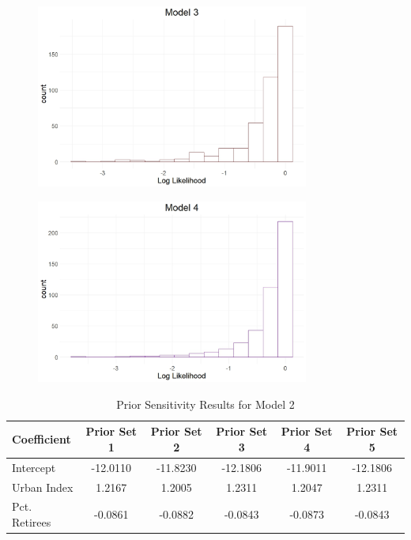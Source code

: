 \documentclass[12pt]{article}
\begin{document}
\begin{figure}[h]
	\centering
	\includegraphics[width=0.8\textwidth]{model_comp_figures/LL_model3.jpeg}
	\caption{}
	\label{}
\end{figure}

\begin{figure}[h]
	\centering
	\includegraphics[width=0.8\textwidth]{model_comp_figures/LL_model4.jpeg}
	\caption{}
	\label{}
\end{figure}

\begin{table}[h]
    \centering
    \begin{tabular}{l|ccccc}
        \hline
        Coefficient    & Prior Set 1 & Prior Set 2 & Prior Set 3 & Prior Set 4 & Prior Set 5 \\
        \hline
        Intercept      & -12.0110 & -11.8230 & -12.1806 & -11.9011 & -12.1806 \\
        Urban Index    & 1.2167 & 1.2005 & 1.2311 & 1.2047 & 1.2311 \\
        Pct. Retirees  & -0.0861 & -0.0882 & -0.0843 & -0.0873 & -0.0843 \\
        \hline
    \end{tabular}
    \caption{Prior Sensitivity Results for Model 2}
    \label{tab:Prior Sensitivity Results for Model 2}
\end{table}
\end{document}

